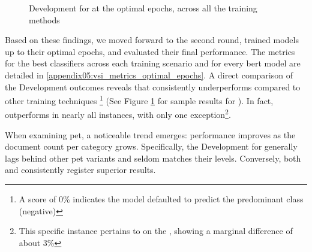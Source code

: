 \begin{figure}[ht]
    \centering
    \caption{Development \fTwo{} for \bertmultilingual{} at the optimal epochs, across all the training methods}
    \label{fig:07_dev_f2_mbert}
\end{figure}

Based on these findings, we moved forward to the second round, trained models up to their optimal epochs, and evaluated their final performance.
The metrics for the best classifiers across each training scenario and for every \gls{bert} model are detailed in \appendixname{} \ref{appendix05:vsi_metrics_optimal_epochs}. 
A direct comparison of the Development \fTwo{} outcomes reveals that \unbalanced{} consistently underperforms compared to other training techniques
\footnote{A \fTwo{} score of 0\% indicates the model defaulted to predict the predominant class (negative)} (See Figure \ref{fig:07_dev_f2_mbert} for sample results for \bertmultilingual{}).
In fact, \balanced{} outperforms \unbalanced{} in nearly all instances, with only one exception\footnote{This specific instance pertains to \bertbase{} on the \trafilaturaTitle{}, showing a marginal difference of about 3\%}.

When examining \gls{pet}, a noticeable trend emerges: performance improves as the document count per category grows. Specifically, the Development \fTwo{} for \petFifty{} generally lags behind other \gls{pet} variants and seldom matches their levels. Conversely, both \petFiveHundred{} and \petThousand{} consistently register superior results.


